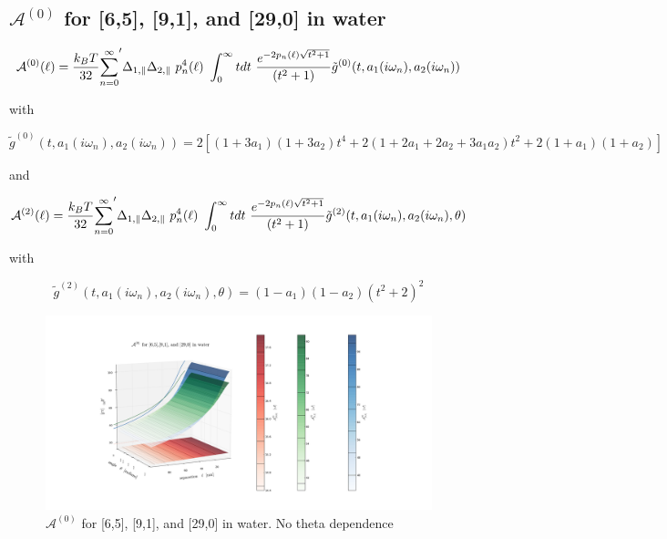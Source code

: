 \documentclass[a4paper]{article}
\begin{document}
\begin{center}
\subsection{$\mathcal{A}^{(0)}$ for [6,5], [9,1], and [29,0] in water}
\begin{equation}
{\cal A}^{(0)}(\ell) = \frac{k_BT}{32}  {\sum_{n=0}^{\infty}}' \Delta_{1,\parallel} \Delta_{2,\parallel} ~p_n^{4}(\ell) ~\int_0^{\infty} t dt ~\frac{e^{- 2 p_n(\ell) \sqrt{t^{2} + 1}}}{(t^{2} + 1)} \tilde g^{(0)}(t, a_1(i \omega_n), a_2(i \omega_n))
\end{equation}

with

\begin{equation}
\tilde g^{(0)}(t, a_1(i \omega_n), a_2(i \omega_n)) = 2 \left[ (1+3a_1)(1+3a_2) t^{4} + 2 (1+2a_1+2a_2+3a_1a_2) t^{2}  + 2(1+a_1)(1+a_2)\right]
\end{equation}

and

\begin{equation}
{\cal A}^{(2)}(\ell) = \frac{k_BT}{32}  {\sum_{n=0}^{\infty}}' \Delta_{1,\parallel} \Delta_{2,\parallel} ~p_n^{4}(\ell) ~\int_0^{\infty} t dt ~\frac{e^{- 2 p_n(\ell) \sqrt{t^{2} + 1}}}{(t^{2} + 1)} \tilde g^{(2)}(t, a_1(i \omega_n), a_2(i \omega_n), \theta)
\end{equation}

with

\begin{equation}
\tilde g^{(2)}(t, a_1(i \omega_n), a_2(i \omega_n), \theta) = (1-a_1)(1-a_2)(t^{2} + 2)^2
\label{befgqw}
\end{equation}

\begin{figure}[t!]
\begin{center}
\includegraphics[width=1.5\textwidth]{plots/A0_65_91_290_srw.png}
\hskip 43pt
\caption{$\mathcal{A}^{(0)}$ for [6,5], [9,1], and [29,0] in water. No theta
dependence}
\label{eiz65}
\end{center}
\end{figure} 


\end{center}
\end{document}
